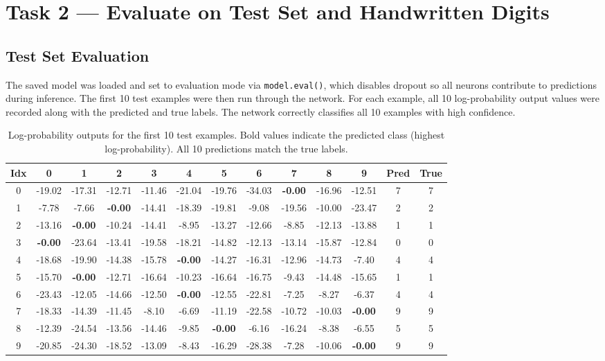 \documentclass[11pt]{article}
\begin{document}
\section{Task 2 --- Evaluate on Test Set and Handwritten Digits}

\subsection{Test Set Evaluation}

The saved model was loaded and set to evaluation mode via
\texttt{model.eval()}, which disables dropout so all neurons
contribute to predictions during inference. The first 10 test examples
were then run through the network. For each example, all 10
log-probability output values were recorded along with the predicted
and true labels. The network correctly classifies all 10 examples with
high confidence.

\begin{table}[H]
    \centering
    \footnotesize
    \begin{tabular}{ccccccccccccc}
        \toprule
        Idx & 0 & 1 & 2 & 3 & 4 & 5 & 6 & 7 & 8 & 9 & Pred & True \\
        \midrule
        0 & -19.02 & -17.31 & -12.71 & -11.46 & -21.04 & -19.76 & -34.03 & \textbf{-0.00} & -16.96 & -12.51 & 7 & 7 \\
        1 & -7.78 & -7.66 & \textbf{-0.00} & -14.41 & -18.39 & -19.81 & -9.08 & -19.56 & -10.00 & -23.47 & 2 & 2 \\
        2 & -13.16 & \textbf{-0.00} & -10.24 & -14.41 & -8.95 & -13.27 & -12.66 & -8.85 & -12.13 & -13.88 & 1 & 1 \\
        3 & \textbf{-0.00} & -23.64 & -13.41 & -19.58 & -18.21 & -14.82 & -12.13 & -13.14 & -15.87 & -12.84 & 0 & 0 \\
        4 & -18.68 & -19.90 & -14.38 & -15.78 & \textbf{-0.00} & -14.27 & -16.31 & -12.96 & -14.73 & -7.40 & 4 & 4 \\
        5 & -15.70 & \textbf{-0.00} & -12.71 & -16.64 & -10.23 & -16.64 & -16.75 & -9.43 & -14.48 & -15.65 & 1 & 1 \\
        6 & -23.43 & -12.05 & -14.66 & -12.50 & \textbf{-0.00} & -12.55 & -22.81 & -7.25 & -8.27 & -6.37 & 4 & 4 \\
        7 & -18.33 & -14.39 & -11.45 & -8.10 & -6.69 & -11.19 & -22.58 & -10.72 & -10.03 & \textbf{-0.00} & 9 & 9 \\
        8 & -12.39 & -24.54 & -13.56 & -14.46 & -9.85 & \textbf{-0.00} & -6.16 & -16.24 & -8.38 & -6.55 & 5 & 5 \\
        9 & -20.85 & -24.30 & -18.52 & -13.09 & -8.43 & -16.29 & -28.38 & -7.28 & -10.06 & \textbf{-0.00} & 9 & 9 \\
        \bottomrule
    \end{tabular}
    \caption{Log-probability outputs for the first 10 test examples.
    Bold values indicate the predicted class (highest log-probability).
    All 10 predictions match the true labels.}
\end{table}
\end{document}
